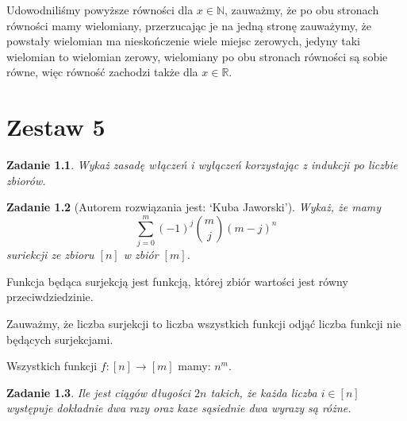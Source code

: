 \documentclass{mwbk}
\newtheorem{zad}{Zadanie}[chapter]
\begin{document}
\begin{mdframed}
\begin{enumerate*}
              Udowodniliśmy powyższe równości dla $x \in \mathbb{N}$, zauważmy, że po obu stronach
              równości mamy wielomiany, przerzucając je na jedną stronę zauważymy, że powstały
              wielomian ma nieskończenie wiele miejsc zerowych, jedyny taki wielomian to wielomian
              zerowy, wielomiany po obu stronach równości są sobie równe, więc równość zachodzi także dla $x \in \mathbb{R}$.
    \end{enumerate*}
\end{mdframed}














\chapter{Zestaw 5}          %

\begin{zad}
    Wykaż zasadę włączeń i wyłączeń korzystając z indukcji po liczbie zbiorów.
\end{zad}
\begin{mdframed}

\end{mdframed}




\begin{zad}[Autorem rozwiązania jest: `Kuba Jaworski']
    Wykaż, że mamy
    \[
        \sum_{j=0}^{m}(-1)^j \binom{m}{j}(m-j)^n
    \]
    suriekcji ze zbioru $[n]$ w zbiór $[m]$.
\end{zad}
\begin{mdframed}
    Funkcja będąca surjekcją jest funkcją, której zbiór wartości jest
    równy przeciwdziedzinie.

    Zauważmy, że liczba surjekcji to liczba wszystkich funkcji odjąć
    liczba funkcji nie będących surjekcjami.

    Wszystkich funkcji $f:[n] \to [m]$ mamy: $n^m$.
\end{mdframed}



\begin{zad}
    Ile jest ciągów długości $2n$ takich, że każda liczba $i \in [n]$
    występuje dokładnie dwa razy oraz kaze sąsiednie dwa wyrazy są różne.
\end{zad}
\begin{mdframed}

\end{mdframed}
\end{document}
